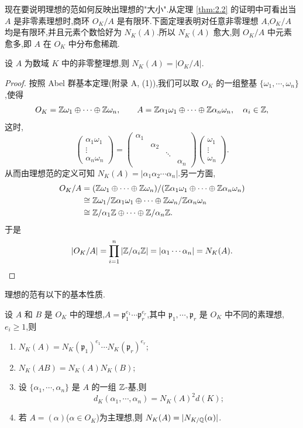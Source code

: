 现在要说明理想的范如何反映出理想的"大小".从定理 \ref{thm:2.2} 的证明中可看出当 $A$ 是非零素理想时,商环 $O_K/A$ 是有限环.下面定理表明对任意非零理想 $A$,$O_K/A$ 均是有限环,并且元素个数恰好为 $N_K(A)$.所以 $N_K(A)$ 愈大,则 $O_K/A$ 中元素愈多,即 $A$ 在 $O_K$ 中分布愈稀疏.

\begin{theorem}\label{thm:2.3}
设 $A$ 为数域 $K$ 中的非零整理想,则 $N_K(A)=|O_K/A|$.
\end{theorem}

\begin{proof}
按照 Abel 群基本定理(附录 A, (1)),我们可以取 $O_K$ 的一组整基 $\{\omega_1,\cdots,\omega_n\}$,使得
\[
  O_K=\mathbb{Z}\omega_1\oplus\cdots\oplus\mathbb{Z}\omega_n,\qquad
  A=\mathbb{Z}\alpha_1\omega_1\oplus\cdots\oplus\mathbb{Z}\alpha_n\omega_n,\quad \alpha_i\in\mathbb{Z},
\]
这时,
\[
  \begin{pmatrix}\alpha_1\omega_1\\ \vdots\\ \alpha_n\omega_n\end{pmatrix}
  =\begin{pmatrix}
    \alpha_1 & & &\\
    & \alpha_2 & &\\
    & & \ddots &\\
    & & & \alpha_n
  \end{pmatrix}
  \begin{pmatrix}\omega_1\\ \vdots\\ \omega_n\end{pmatrix}.
\]
从而由理想范的定义可知 $N_K(A)=|\alpha_1\alpha_2\cdots\alpha_n|$.另一方面,
\begin{align*}
  O_K/A&=(\mathbb{Z}\omega_1\oplus\cdots\oplus\mathbb{Z}\omega_n)/(\mathbb{Z}\alpha_1\omega_1\oplus\cdots\oplus\mathbb{Z}\alpha_n\omega_n)\\
  &\cong\mathbb{Z}\omega_1/\mathbb{Z}\alpha_1\omega_1\oplus\cdots\oplus\mathbb{Z}\omega_n/\mathbb{Z}\alpha_n\omega_n\\
  &\cong\mathbb{Z}/\alpha_1\mathbb{Z}\oplus\cdots\oplus\mathbb{Z}/\alpha_n\mathbb{Z}.
\end{align*}
于是
\[
  |O_K/A|=\prod_{i=1}^{n}|\mathbb{Z}/\alpha_i\mathbb{Z}|=|\alpha_1\cdots\alpha_n|=N_K(A).
\]
\end{proof}

理想的范有以下的基本性质.

\begin{theorem}\label{thm:2.4}
设 $A$ 和 $B$ 是 $O_K$ 中的理想,$A=\mathfrak{p}_1^{e_1}\cdots\mathfrak{p}_r^{e_r}$,其中 $\mathfrak{p}_1,\cdots,\mathfrak{p}_r$ 是 $O_K$ 中不同的素理想,$e_i\geqslant 1$,则
\begin{enumerate}[(1)]
  \item $N_K(A)=N_K(\mathfrak{p}_1)^{e_1}\cdots N_K(\mathfrak{p}_r)^{e_r}$;
  \item $N_K(AB)=N_K(A)N_K(B)$;
  \item 设 $\{\alpha_1,\cdots,\alpha_n\}$ 是 $A$ 的一组 $\mathbb{Z}$-基,则
        \[
          d_K(\alpha_1,\cdots,\alpha_n)=N_K(A)^2d(K);
        \]
  \item 若 $A=(\alpha)$($\alpha\in O_K$)为主理想,则 $N_K(A)=|N_{K/\mathbb{Q}}(\alpha)|$.
\end{enumerate}
\end{theorem}


